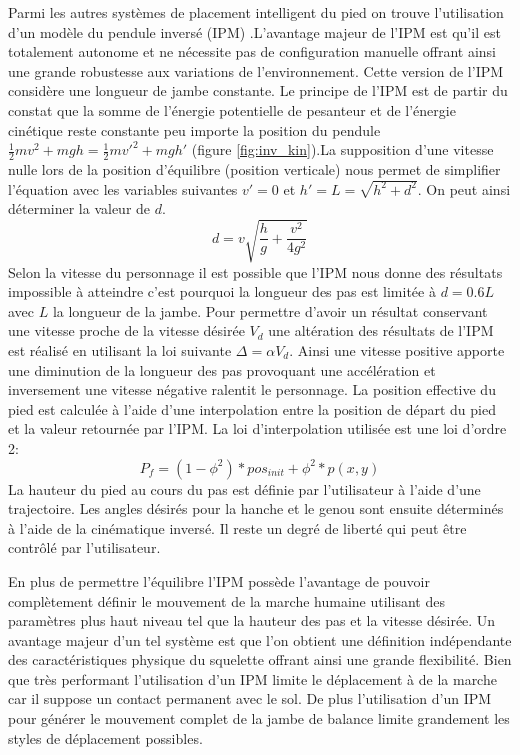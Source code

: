 \documentclass{llncs}
\begin{document}
Parmi les autres systèmes de placement intelligent du pied on trouve l'utilisation d'un modèle du pendule inversé (IPM) \cite{kajita20013d,coros2010generalized}.L'avantage majeur de l'IPM est qu'il est totalement autonome et ne nécessite pas de configuration manuelle offrant ainsi une grande robustesse aux variations de l'environnement. Cette version de l'IPM considère une longueur de jambe constante. Le principe de l'IPM est de partir du constat que la somme de l'énergie potentielle de pesanteur et de l'énergie cinétique reste constante peu importe la position du pendule  $\frac{1}{2}mv^2+mgh=\frac{1}{2}mv'^2+mgh'$ (figure \ref{fig:inv_kin}).La supposition d'une vitesse nulle lors de la position d'équilibre (position verticale) nous permet de simplifier l'équation avec les variables suivantes \(v'=0\) et \(h'=L=\sqrt{h^2+d^2}\). On peut ainsi déterminer la valeur de \(d\).
\[
d=v\sqrt{\frac{h}{g}+\frac{v^2}{4g^2}}
\]
Selon la vitesse du personnage il est possible que l'IPM nous donne des résultats impossible à atteindre c'est pourquoi la longueur des pas est limitée à \(d=0.6L\) avec \(L\) la longueur de la jambe.
Pour permettre d'avoir un résultat conservant une vitesse proche de la vitesse désirée \(V_d\) une altération des résultats de l'IPM est réalisé en utilisant la loi suivante \(\Delta=\alpha V_d\). Ainsi une vitesse positive apporte une diminution de la longueur des pas provoquant une accélération et inversement une vitesse négative ralentit le personnage.
La position effective du pied est calculée à l'aide d'une interpolation entre la position de départ du pied et la valeur retournée par l'IPM. La loi d'interpolation utilisée est une loi d'ordre 2:
\[
P_f=(1-\phi^2)*pos_{init}+\phi^2*p(x,y)
\]
La hauteur du pied au cours du pas est définie par l'utilisateur à l'aide d'une trajectoire.
Les angles désirés pour la hanche et le genou sont ensuite déterminés à l'aide de la cinématique inversé. Il reste un degré de liberté qui peut être contrôlé par l'utilisateur.

En plus de permettre l'équilibre l'IPM possède l'avantage de pouvoir complètement définir le mouvement de la marche humaine utilisant des paramètres plus haut niveau tel que la hauteur des pas et la vitesse désirée. Un avantage majeur d'un tel système est que l'on obtient une définition indépendante des caractéristiques physique du squelette offrant ainsi une grande flexibilité. Bien que très performant l'utilisation d'un IPM limite le déplacement à de la marche car il suppose un contact permanent avec le sol. De plus l'utilisation d'un IPM pour générer le mouvement complet de la jambe de balance limite grandement les styles de déplacement possibles.
\end{document}

